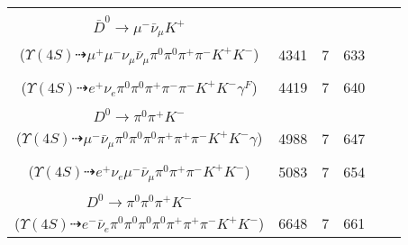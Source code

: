 \documentclass[landscape]{article}
\newcounter{rownumbers}
\newcommand\rn{\stepcounter{rownumbers}\arabic{rownumbers}}
\newcommand{\EOLP}{\\ \hline} %
\newcommand{\topoTags}[1]{#1} %
\begin{document}
\begin{longtable}{clcccc}
\rn & \makecell[l]{ $ 
\Upsilon(4S) \rightarrow B^{+} B^{-} ,
B^{+} \rightarrow \mu^{+} \nu_{\mu} \bar{D}^{*0} ,
B^{-} \rightarrow \rho^{-} D^{0} ,
\bar{D}^{*0} \rightarrow \pi^{0} \bar{D}^{0} ,
\rho^{-} \rightarrow \pi^{0} \pi^{-} ,
D^{0} \rightarrow \pi^{+} K^{-} ,
$ \\ $
\bar{D}^{0} \rightarrow \mu^{-} \bar{\nu}_{\mu} K^{+} 
$ \\ ($
\Upsilon(4S) \dashrightarrow \mu^{+} \mu^{-} \nu_{\mu} \bar{\nu}_{\mu} \pi^{0} \pi^{0} \pi^{+} \pi^{-} K^{+} K^{-} 
$) } & \topoTags{4341 & }7 & 633 \EOLP

\rn & \makecell[l]{ $ 
\Upsilon(4S) \rightarrow B^{+} B^{-} ,
B^{+} \rightarrow e^{+} \nu_{e} \bar{D}^{0} \gamma^{F} ,
B^{-} \rightarrow \rho^{-} D^{0} ,
\bar{D}^{0} \rightarrow \pi^{0} \pi^{-} K^{+} ,
\rho^{-} \rightarrow \pi^{0} \pi^{-} ,
D^{0} \rightarrow \pi^{+} K^{-} 
$ \\ ($
\Upsilon(4S) \dashrightarrow e^{+} \nu_{e} \pi^{0} \pi^{0} \pi^{+} \pi^{-} \pi^{-} K^{+} K^{-} \gamma^{F} 
$) } & \topoTags{4419 & }7 & 640 \EOLP

\rn & \makecell[l]{ $ 
\Upsilon(4S) \rightarrow B^{+} B^{-} ,
B^{+} \rightarrow \rho^{+} \bar{D}^{0} ,
B^{-} \rightarrow \mu^{-} \bar{\nu}_{\mu} D^{*0} ,
\rho^{+} \rightarrow \pi^{0} \pi^{+} ,
\bar{D}^{0} \rightarrow \pi^{0} \pi^{-} K^{+} ,
D^{*0} \rightarrow D^{0} \gamma ,
$ \\ $
D^{0} \rightarrow \pi^{0} \pi^{+} K^{-} 
$ \\ ($
\Upsilon(4S) \dashrightarrow \mu^{-} \bar{\nu}_{\mu} \pi^{0} \pi^{0} \pi^{0} \pi^{+} \pi^{+} \pi^{-} K^{+} K^{-} \gamma 
$) } & \topoTags{4988 & }7 & 647 \EOLP

\rn & \makecell[l]{ $ 
\Upsilon(4S) \rightarrow B^{+} B^{-} ,
B^{+} \rightarrow \rho^{+} \bar{D}^{0} ,
B^{-} \rightarrow \mu^{-} \bar{\nu}_{\mu} D^{0} ,
\rho^{+} \rightarrow \pi^{0} \pi^{+} ,
\bar{D}^{0} \rightarrow \pi^{-} K^{+} ,
D^{0} \rightarrow e^{+} \nu_{e} K^{-} 
$ \\ ($
\Upsilon(4S) \dashrightarrow e^{+} \nu_{e} \mu^{-} \bar{\nu}_{\mu} \pi^{0} \pi^{+} \pi^{-} K^{+} K^{-} 
$) } & \topoTags{5083 & }7 & 654 \EOLP

\rn & \makecell[l]{ $ 
\Upsilon(4S) \rightarrow B^{+} B^{-} ,
B^{+} \rightarrow \rho^{+} \bar{D}^{0} ,
B^{-} \rightarrow e^{-} \bar{\nu}_{e} D^{*0} ,
\rho^{+} \rightarrow \pi^{0} \pi^{+} ,
\bar{D}^{0} \rightarrow \pi^{-} K^{+} ,
D^{*0} \rightarrow \pi^{0} D^{0} ,
$ \\ $
D^{0} \rightarrow \pi^{0} \pi^{0} \pi^{+} K^{-} 
$ \\ ($
\Upsilon(4S) \dashrightarrow e^{-} \bar{\nu}_{e} \pi^{0} \pi^{0} \pi^{0} \pi^{0} \pi^{+} \pi^{+} \pi^{-} K^{+} K^{-} 
$) } & \topoTags{6648 & }7 & 661 \EOLP


\end{longtable}
\end{document}
